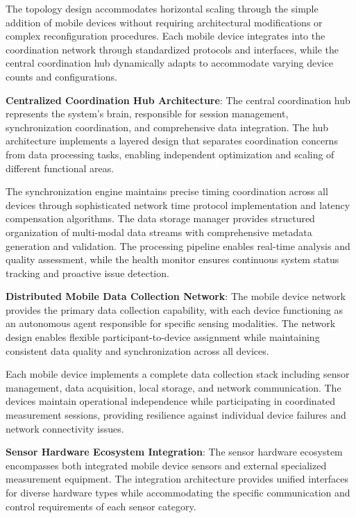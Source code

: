 \documentclass[12pt,a4paper]{article}
\begin{document}
The topology design accommodates horizontal scaling through the simple addition of mobile devices without requiring
architectural modifications or complex reconfiguration procedures. Each mobile device integrates into the coordination
network through standardized protocols and interfaces, while the central coordination hub dynamically adapts to
accommodate varying device counts and configurations.

\textbf{Centralized Coordination Hub Architecture}: The central coordination hub represents the system's brain, responsible
for session management, synchronization coordination, and comprehensive data integration. The hub architecture
implements a layered design that separates coordination concerns from data processing tasks, enabling independent
optimization and scaling of different functional areas.

The synchronization engine maintains precise timing coordination across all devices through sophisticated network time
protocol implementation and latency compensation algorithms. The data storage manager provides structured organization
of multi-modal data streams with comprehensive metadata generation and validation. The processing pipeline enables
real-time analysis and quality assessment, while the health monitor ensures continuous system status tracking and
proactive issue detection.

\textbf{Distributed Mobile Data Collection Network}: The mobile device network provides the primary data collection
capability, with each device functioning as an autonomous agent responsible for specific sensing modalities. The network
design enables flexible participant-to-device assignment while maintaining consistent data quality and synchronization
across all devices.

Each mobile device implements a complete data collection stack including sensor management, data acquisition, local
storage, and network communication. The devices maintain operational independence while participating in coordinated
measurement sessions, providing resilience against individual device failures and network connectivity issues.

\textbf{Sensor Hardware Ecosystem Integration}: The sensor hardware ecosystem encompasses both integrated mobile device
sensors and external specialized measurement equipment. The integration architecture provides unified interfaces for
diverse hardware types while accommodating the specific communication and control requirements of each sensor category.
\end{document}
